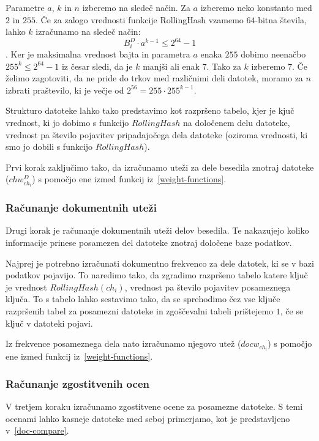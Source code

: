\documentclass{acm_proc_article-sp}
\begin{document}
Parametre $a$, $k$ in $n$ izberemo na sledeč način. Za $a$ izberemo neko konstanto med $2$ in $255$. Če za zalogo vrednosti funkcije RollingHash vzamemo $64$-bitna števila, lahko $k$ izračunamo na sledeč način: \begin{displaymath}  B_{i}^{D} \cdot a^{k-1} \leq 2^{64}-1\end{displaymath}. Ker je maksimalna vrednost bajta in parametra $a$ enaka $255$ dobimo neenačbo $255^k \leq 2^{64}-1$ iz česar sledi, da je $k$ manjši ali enak $7$. Tako za $k$ izberemo $7$. Če želimo zagotoviti, da ne pride do trkov med različnimi deli datotek, moramo za $n$ izbrati praštevilo, ki je večje od $2^56=255\cdot 255^{k-1}$. 

Strukturo datoteke lahko tako predstavimo kot razpršeno tabelo, kjer je kjuč vrednost, ki jo dobimo s funkcijo $RollingHash$ na določenem delu datoteke, vrednost pa število pojavitev pripadajočega dela datoteke (oziroma vrednosti, ki smo jo dobili s funkcijo $RollingHash$).

Prvi korak zaključimo tako, da izračunamo uteži za dele besedila znotraj datoteke ($chw_{ch_i}^D$) s pomočjo ene izmed funkcij iz~\ref{weight-functions}. 

\subsubsection{Računanje dokumentnih uteži}

Drugi korak je računanje dokumentnih uteži delov besedila. Te nakazujejo koliko informacije prinese posamezen del datoteke znotraj določene baze podatkov. 

Najprej je potrebno izračunati dokumentno frekvenco za dele datotek, ki se v bazi podatkov pojavijo. To naredimo tako, da zgradimo razpršeno tabelo katere ključ je vrednost $RollingHash(ch_i)$, vrednost pa število pojavitev posameznega ključa. To s tabelo lahko sestavimo tako, da se sprehodimo čez vse ključe razpršenih tabel za posamezni datoteke in zgoščevalni tabeli prištejemo $1$, če se ključ v datoteki pojavi.

Iz frekvence posameznega dela nato izračunamo njegovo utež ($docw_{ch_i}$) s pomočjo ene izmed funkcij iz~\ref{weight-functions}.

\subsubsection{Računanje zgostitvenih ocen}

V tretjem koraku izračunamo zgostitvene ocene za posamezne datoteke. S temi ocenami lahko kasneje datoteke med seboj primerjamo, kot je predstavljeno v~\ref{doc-compare}.
\end{document}
